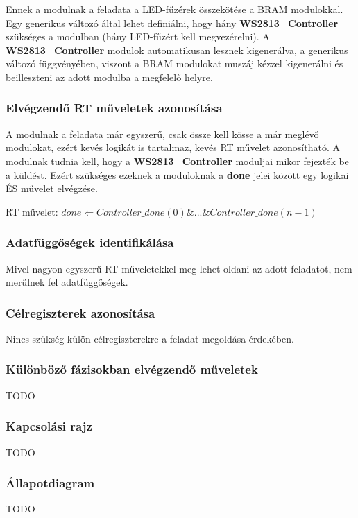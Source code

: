 \tab Ennek a modulnak a feladata a LED-fűzérek összekötése a BRAM modulokkal. Egy generikus változó által lehet definiálni, hogy hány \textbf{WS2813\_Controller} szükséges a modulban (hány LED-fűzért kell megvezérelni).
A \textbf{WS2813\_Controller} modulok automatikusan lesznek kigenerálva, a generikus változó függvényében, viszont a BRAM modulokat muszáj kézzel kigenerálni és beilleszteni az adott modulba a megfelelő helyre.

\subsubsection{Elvégzendő RT műveletek azonosítása}

\tab A modulnak a feladata már egyszerű, csak össze kell kösse a már meglévő modulokat, ezért kevés logikát is tartalmaz, kevés RT művelet azonosítható. 
A modulnak tudnia kell, hogy a \textbf{WS2813\_Controller} moduljai mikor fejezték be a küldést. Ezért szükséges ezeknek a moduloknak a \textbf{done} jelei között egy logikai ÉS művelet elvégzése.

\tab RT művelet: $done \Leftarrow Controller\_done(0) \& ... \& Controller\_done(n - 1)$


\subsubsection{Adatfüggőségek identifikálása}

\tab Mivel nagyon egyszerű RT műveletekkel meg lehet oldani az adott feladatot, nem merűlnek fel adatfüggőségek.


\subsubsection{Célregiszterek azonosítása}

\tab Nincs szükség külön célregiszterekre a feladat megoldása érdekében.


\subsubsection{Különböző fázisokban elvégzendő műveletek}

TODO


\subsubsection{Kapcsolási rajz}

TODO

\subsubsection{Állapotdiagram}

TODO